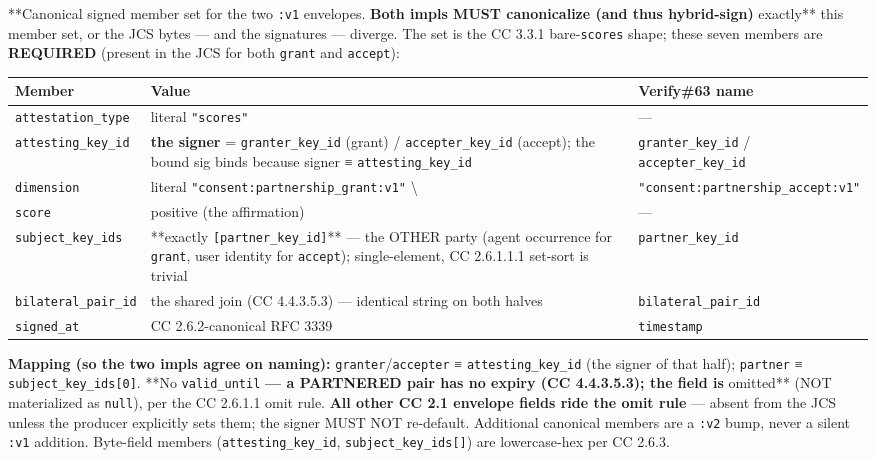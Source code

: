\documentclass[11pt]{article}
\begin{document}
**Canonical signed member set for the two \texttt{:v1} envelopes.\textbf{ Both impls MUST canonicalize (and thus hybrid-sign) }exactly** this member set, or the JCS bytes — and the signatures — diverge. The set is the CC 3.3.1 bare-\texttt{scores} shape; these seven members are \textbf{REQUIRED} (present in the JCS for both \texttt{grant} and \texttt{accept}):


{\footnotesize
\begin{longtable}{|p{5.33cm}|p{5.33cm}|p{5.33cm}|}\hline
\textbf{Member} & \textbf{Value} & \textbf{Verify\#63 name} \\ \hline\endhead
\texttt{attestation\_type} & literal \texttt{"scores"} & — \\ \hline
\texttt{attesting\_key\_id} & \textbf{the signer} = \texttt{granter\_key\_id} (grant) / \texttt{accepter\_key\_id} (accept); the bound sig binds because signer ≡ \texttt{attesting\_key\_id} & \texttt{granter\_key\_id} / \texttt{accepter\_key\_id} \\ \hline
\texttt{dimension} & literal \texttt{"consent:partnership\_grant:v1"} \textbackslash{} & \texttt{"consent:partnership\_accept:v1"} \\ \hline
\texttt{score} & positive (the affirmation) & — \\ \hline
\texttt{subject\_key\_ids} & **exactly \texttt{[partner\_key\_id]}** — the OTHER party (agent occurrence for \texttt{grant}, user identity for \texttt{accept}); single-element, CC 2.6.1.1.1 set-sort is trivial & \texttt{partner\_key\_id} \\ \hline
\texttt{bilateral\_pair\_id} & the shared join (CC 4.4.3.5.3) — identical string on both halves & \texttt{bilateral\_pair\_id} \\ \hline
\texttt{signed\_at} & CC 2.6.2-canonical RFC 3339 & \texttt{timestamp} \\ \hline
\end{longtable}}


\textbf{Mapping (so the two impls agree on naming):} \texttt{granter}/\texttt{accepter} ≡ \texttt{attesting\_key\_id} (the signer of that half); \texttt{partner} ≡ \texttt{subject\_key\_ids[0]}. **No \texttt{valid\_until}\textbf{ — a PARTNERED pair has no expiry (CC 4.4.3.5.3); the field is }omitted** (NOT materialized as \texttt{null}), per the CC 2.6.1.1 omit rule. \textbf{All other CC 2.1 envelope fields ride the omit rule} — absent from the JCS unless the producer explicitly sets them; the signer MUST NOT re-default. Additional canonical members are a \texttt{:v2} bump, never a silent \texttt{:v1} addition. Byte-field members (\texttt{attesting\_key\_id}, \texttt{subject\_key\_ids[]}) are lowercase-hex per CC 2.6.3.
\end{document}

